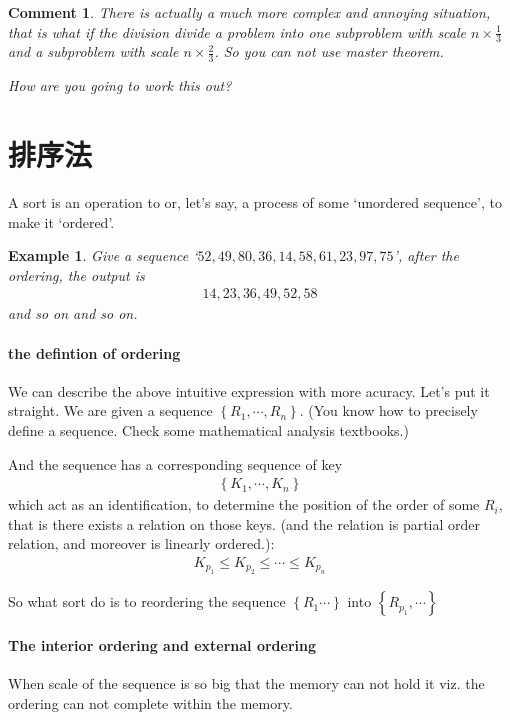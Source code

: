 \documentclass[a4paper, 10pt]{ctexart} %
\newtheorem{example}{Example}
\newtheorem{corollary}{Comment}
\begin{document}
\begin{corollary}
    There is actually a much more complex and annoying situation, that is what if the division divide 
    a problem into one subproblem with scale $n \times \frac{1}{3}$ and a subproblem with scale $n \times \frac{2}{3}$. So you can not 
    use master theorem.

    How are you going to work this out?
\end{corollary}

\section{排序法}
A sort is an operation to or, let's say, a process of some `unordered sequence', to make it `ordered'. 
\begin{example}
    Give a sequence `$52 , 49 , 80 ,  36  , 14 , 58 ,  61 , 23 , 97 , 75$', after the ordering,
    the output is 
    \begin{align*}
        14, 23 , 36  , 49 , 52 ,  58 
    \end{align*}
    and so on and so on.
\end{example}

\paragraph{the defintion of ordering} We can describe the above intuitive expression with more acuracy.
Let's put it straight. We are given a sequence $\left\{R_{1}, \cdots   ,R_{n}\right\}$. (You know how to precisely define 
a sequence. Check some mathematical analysis textbooks.)

And the sequence has a corresponding sequence of key
\begin{align*}
    \left\{K_{1} , \cdots  , K_{n}\right\}
\end{align*}
which act as an identification, to determine the position of the order of some $R_{i}$, that is there exists a relation on those keys. (and the relation is partial order relation, and moreover is 
linearly ordered.):
\begin{align*}
    K_{p_{1}} \le K_{p_{2}} \le \cdots  \le K_{p_{n}}
\end{align*}

So what sort do is to reordering the sequence $\left\{R_{1} \cdots \right\}$ into $\left\{ R_{p_{1}}, \cdots \right\}$

\paragraph{The interior ordering and external ordering} When scale of the sequence is so big that the memory can not 
hold it viz. the ordering can not complete within the memory. 
\end{document}
